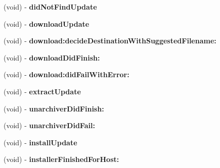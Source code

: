 \begin{DoxyCompactItemize}
(void) -\/ {\bfseries did\+Not\+Find\+Update}
\item 
\mbox{\label{interface_s_u_basic_update_driver_ac70192121a53c389c46d854443f0b8ee}} 
(void) -\/ {\bfseries download\+Update}
\item 
\mbox{\label{interface_s_u_basic_update_driver_a14963e1bc04534912660eb1c05a9291e}} 
(void) -\/ {\bfseries download\+:decide\+Destination\+With\+Suggested\+Filename\+:}
\item 
\mbox{\label{interface_s_u_basic_update_driver_a259f1d098a40c69ae04ec814619a646d}} 
(void) -\/ {\bfseries download\+Did\+Finish\+:}
\item 
\mbox{\label{interface_s_u_basic_update_driver_a81b0f3fd4280b9d9a7fffeac3e29d00b}} 
(void) -\/ {\bfseries download\+:did\+Fail\+With\+Error\+:}
\item 
\mbox{\label{interface_s_u_basic_update_driver_a167455ad356394a34d7b9522c7d4f3cf}} 
(void) -\/ {\bfseries extract\+Update}
\item 
\mbox{\label{interface_s_u_basic_update_driver_a45083a385b412e146a355166dc04c6dd}} 
(void) -\/ {\bfseries unarchiver\+Did\+Finish\+:}
\item 
\mbox{\label{interface_s_u_basic_update_driver_a4b1861b12c0e008e26e9d6158e624455}} 
(void) -\/ {\bfseries unarchiver\+Did\+Fail\+:}
\item 
\mbox{\label{interface_s_u_basic_update_driver_aa1a9b0b7e8d0ca5aec90cc9e9f8f95ad}} 
(void) -\/ {\bfseries install\+Update}
\item 
\mbox{\label{interface_s_u_basic_update_driver_a1d061b84a74ce87912e2a38b6ffcbd98}} 
(void) -\/ {\bfseries installer\+Finished\+For\+Host\+:}
\item 
\mbox{\label{interface_s_u_basic_update_driver_ac9e4801bc75aa6bae8649171e988032b}} 

\end{DoxyCompactItemize}
